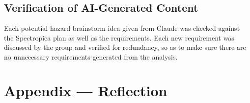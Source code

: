 \documentclass{article}
\begin{document}
\subsection{Verification of AI-Generated Content}


Each potential hazard brainstorm idea given from Claude was checked against the Spectropica plan as well as the requirements. Each new requirement was discussed by the group and verified for redundancy, so as to make sure there are no unnecessary requirements generated from the analysis.

\newpage{}

\section{Appendix --- Reflection}


\end{document}
